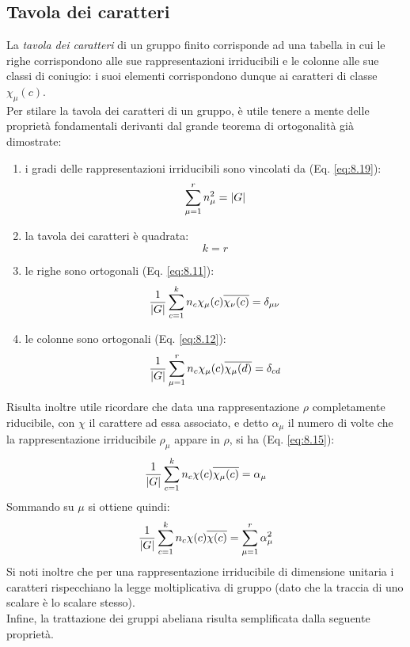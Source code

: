 \subsection{Tavola dei caratteri}

La \textit{tavola dei caratteri} di un gruppo finito corrisponde ad una tabella in cui le righe corrispondono alle sue rappresentazioni irriducibili e le colonne alle sue classi di coniugio: i suoi elementi corrispondono dunque ai caratteri di classe $ \chi_{\mu}(c) $.\\
Per stilare la tavola dei caratteri di un gruppo, è utile tenere a mente delle proprietà fondamentali derivanti dal grande teorema di ortogonalità già dimostrate:
\begin{enumerate}
	\item i gradi delle rappresentazioni irriducibili sono vincolati da (Eq. \ref{eq:8.19}):
		\begin{equation}
			\sum_{\mu = 1}^{r} n_{\mu}^2 = \left\lvert G\right\rvert
			\label{eq:8.21}
		\end{equation}
	\item la tavola dei caratteri è quadrata:
		\begin{equation}
			k = r
			\label{eq:8.22}
		\end{equation}
	\item le righe sono ortogonali (Eq. \ref{eq:8.11}):
		\begin{equation}
			\frac{1}{\left\lvert G\right\rvert} \sum_{c = 1}^{k} n_c \chi_{\mu}(c) \overline{\chi_{\nu}(c)} = \delta_{\mu \nu}
			\label{eq:8.23}
		\end{equation}
	\item le colonne sono ortogonali (Eq. \ref{eq:8.12}):
		\begin{equation}
			\frac{1}{\left\lvert G\right\rvert} \sum_{\mu = 1}^{r} n_c \chi_{\mu}(c) \overline{\chi_{\mu}(d)} = \delta_{cd}
			\label{eq:8.24}
		\end{equation}
\end{enumerate}
Risulta inoltre utile ricordare che data una rappresentazione $ \rho $ completamente riducibile, con $ \chi $ il carattere ad essa associato, e detto $ \alpha_{\mu} $ il numero di volte che la rappresentazione irriducibile $ \rho_{\mu} $ appare in $ \rho $, si ha (Eq. \ref{eq:8.15}):
\begin{equation}
	\frac{1}{\left\lvert G\right\rvert} \sum_{c = 1}^{k} n_c \chi(c) \overline{\chi_{\mu}(c)} = \alpha_{\mu}
	\label{eq:8.25}
\end{equation}
Sommando su $ \mu $ si ottiene quindi:
\begin{equation}
	\frac{1}{\left\lvert G\right\rvert} \sum_{c = 1}^{k} n_c \chi(c) \overline{\chi(c)} = \sum_{\mu = 1}^{r} \alpha_{\mu}^2
	\label{eq:8.26}
\end{equation}
Si noti inoltre che per una rappresentazione irriducibile di dimensione unitaria i caratteri rispecchiano la legge moltiplicativa di gruppo (dato che la traccia di uno scalare è lo scalare stesso).\\
Infine, la trattazione dei gruppi abeliana risulta semplificata dalla seguente proprietà.

